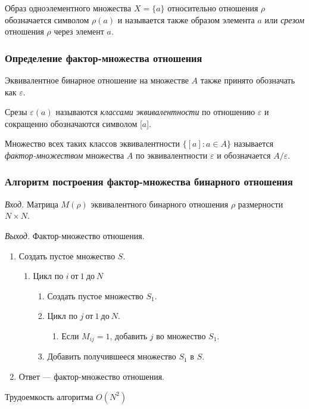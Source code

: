 \documentclass[bachelor, och, labwork]{shiza}
\begin{document}
Образ одноэлементного множества $X=\{a\}$ относительно отношения $\rho$
обозначается символом $\rho(a)$ и называется также образом элемента $a$ или
\textit{срезом} отношения $\rho$ через элемент $a$.

\subsubsection{Определение фактор-множества отношения}

Эквивалентное бинарное отношение на множестве $A$ также принято обозначать как
$\varepsilon$.

Срезы $\varepsilon(a)$ называются \textit{классами эквивалентности} по отношению
$\varepsilon$ и сокращенно обозначаются символом [$a$].

Множество всех таких классов эквивалентности $\{[a]:a\in A\}$ называется 
\textit{фактор-множеством} множества $A$ по эквивалентности $\varepsilon$ и 
обозначается $A/\varepsilon$.

\subsubsection{Алгоритм построения фактор-множества бинарного отношения}

\textit{Вход.} Матрица $M(\rho)$ эквивалентного бинарного отношения $\rho$ размерности
$N \times N$.

\textit{Выход.} Фактор-множество отношения.

\begin{enumerate}
    \item Создать пустое множество $S$.
    \begin{enumerate}[label=a)]
        \item Цикл по $i ~\text{от}~ 1 ~\text{до}~ N$
            \begin{enumerate} 
                \item Создать пустое множество $S_1$.
                \item Цикл по $j ~\text{от}~ 1 ~\text{до}~ N$.
                    \begin{enumerate}\item Если $M_{ij} = 1$, добавить $j$ во множество $S_1$.\end{enumerate}
                \item Добавить получившееся множество $S_1$ в $S$.
            \end{enumerate}
    \end{enumerate}
    \item Ответ --- фактор-множество отношения.
\end{enumerate}
    Трудоемкость алгоритма $O(N^2)$
\end{document}
